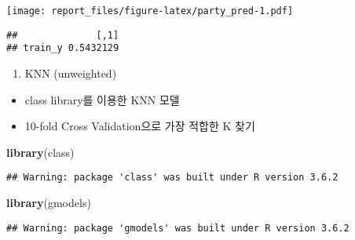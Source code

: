 \documentclass[]{article}
\newenvironment{Shaded}{\begin{snugshade}}{\end{snugshade}}
\newcommand{\KeywordTok}[1]{\textcolor[rgb]{0.13,0.29,0.53}{\textbf{#1}}}
\newcommand{\NormalTok}[1]{#1}
\newcommand{\OperatorTok}[1]{\textcolor[rgb]{0.81,0.36,0.00}{\textbf{#1}}}
\providecommand{\tightlist}{%
  \setlength{\itemsep}{0pt}\setlength{\parskip}{0pt}}
\begin{document}
\texttt{[image: report\_files/figure-latex/party\_pred-1.pdf]}

\begin{Shaded}
\end{Shaded}

\begin{verbatim}
##              [,1]
## train_y 0.5432129
\end{verbatim}

\begin{enumerate}
\def\labelenumi{\arabic{enumi})}
\setcounter{enumi}{3}
\tightlist
\item
  KNN (unweighted)
\end{enumerate}

\begin{itemize}
\item
  class library를 이용한 KNN 모델
\item
  10-fold Cross Validation으로 가장 적합한 K 찾기
\end{itemize}

\begin{Shaded}
\begin{Highlighting}[]
\KeywordTok{library}\NormalTok{(class)}
\end{Highlighting}
\end{Shaded}

\begin{verbatim}
## Warning: package 'class' was built under R version 3.6.2
\end{verbatim}

\begin{Shaded}
\begin{Highlighting}[]
\KeywordTok{library}\NormalTok{(gmodels)}
\end{Highlighting}
\end{Shaded}

\begin{verbatim}
## Warning: package 'gmodels' was built under R version 3.6.2
\end{verbatim}
\end{document}
